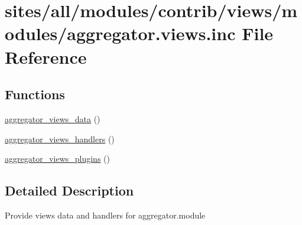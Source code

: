 \hypertarget{aggregator_8views_8inc}{
\section{sites/all/modules/contrib/views/modules/aggregator.views.inc File Reference}
\label{aggregator_8views_8inc}
}
\subsection*{Functions}
\begin{CompactItemize}
\item 
\hyperlink{group__views__aggregator__module_g2a3f8960770694f1a6d3c0e2d7e24119}{aggregator\_\-views\_\-data} ()
\item 
\hyperlink{group__views__aggregator__module_g337e78cf30439d09694614deb0e1dab0}{aggregator\_\-views\_\-handlers} ()
\item 
\hyperlink{group__views__aggregator__module_g1260b78865a34f57c44780293ea022b2}{aggregator\_\-views\_\-plugins} ()
\end{CompactItemize}


\subsection{Detailed Description}
Provide views data and handlers for aggregator.module 